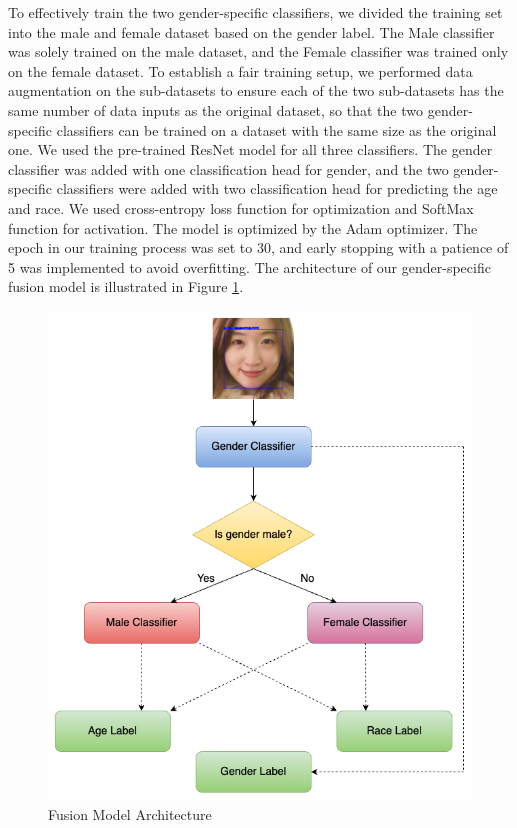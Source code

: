 \documentclass[DIV=calc, paper=a4, fontsize=10pt, twocolumn]{article}
\begin{document}
	To effectively train the two gender-specific classifiers, we divided the training set into the male and female dataset based on the gender label. The Male classifier was solely trained on the male dataset, and the Female classifier was trained only on the female dataset. To establish a fair training setup, we performed data augmentation on the sub-datasets to ensure each of the two sub-datasets has the same number of data inputs as the original dataset, so that the two gender-specific classifiers can be trained on a dataset with the same size as the original one. We used the pre-trained ResNet model for all three classifiers. The gender classifier was added with one classification head for gender, and the two gender-specific classifiers were added with two classification head for predicting the age and race. We used cross-entropy loss function for optimization and SoftMax function for activation. The model is optimized by the Adam optimizer. The epoch in our training process was set to 30, and early stopping with a patience of 5 was implemented to avoid overfitting.  The architecture of our gender-specific fusion model is illustrated in Figure \ref{fig:fusion}.
	
	\begin{figure}[t]
	\centering
	\includegraphics[width=1.0\linewidth]{imgs/fusion}
	\caption{Fusion Model Architecture}
	\label{fig:fusion}
	\end{figure}
	
\end{document}
